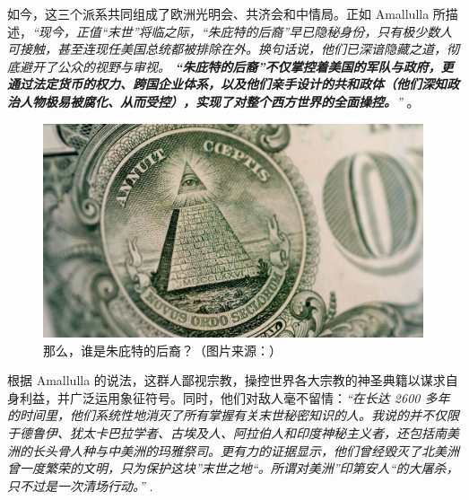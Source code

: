 \documentclass[10pt,twocolumn,letterpaper]{article}
\begin{document}
如今，这三个派系共同组成了欧洲光明会、共济会和中情局。正如 Amallulla 所描述，\textit{“现今，正值“末世”将临之际，“朱庇特的后裔”早已隐秘身份，只有极少数人可接触，甚至连现任美国总统都被排除在外。换句话说，他们已深谙隐藏之道，彻底避开了公众的视野与审视。 \textbf{“朱庇特的后裔”不仅掌控着美国的军队与政府，更通过法定货币的权力、跨国企业体系，以及他们亲手设计的共和政体（他们深知政治人物极易被腐化、从而受控），实现了对整个西方世界的全面操控。}”} \cite{33,34}。

\begin{figure}[h]
\begin{center}
   \includegraphics[width=1\linewidth]{illuminati.jpg}

\end{center}
   \caption{那么，谁是朱庇特的后裔？（图片来源：\cite{35}）}
\label{fig:10}
\label{fig:onecol}
\end{figure}

根据 Amallulla 的说法，这群人鄙视宗教，操控世界各大宗教的神圣典籍以谋求自身利益，并广泛运用象征符号。同时，他们对敌人毫不留情：\textit{“在长达 2600 多年的时间里，他们系统性地消灭了所有掌握有关末世秘密知识的人。我说的并不仅限于德鲁伊、犹太卡巴拉学者、古埃及人、阿拉伯人和印度神秘主义者，还包括南美洲的长头骨人种与中美洲的玛雅祭司。更有力的证据显示，他们曾经毁灭了北美洲曾一度繁荣的文明，只为保护这块”末世之地“。所谓对美洲”印第安人“的大屠杀，只不过是一次清场行动。”} \cite{33,34}.
\end{document}
